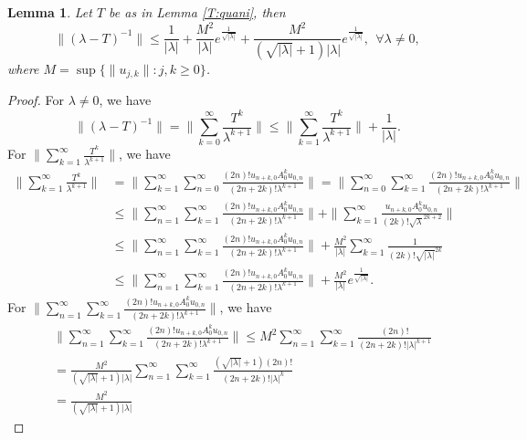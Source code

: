 \documentclass[12pt]{amsart}
\numberwithin{equation}{section}
\theoremstyle{plain}
\newtheorem{lem}[thm]{Lemma}
\theoremstyle{definition}
\begin{document}
\begin{lem}
Let $T$ be as in Lemma \ref{T:quani}, then
\begin{equation}\label{S4:lnorm}
\|(\lambda-T)^{-1}\|\leq \frac{1}{|\lambda|}+ \frac{M^2}{|\lambda|}e^{\frac{1}{\sqrt{|\lambda|}}}+
\frac{M^2}{(\sqrt{|\lambda|}+1)|\lambda|}e^{\frac{1}{\sqrt{|\lambda|}}}, \ \ \forall\lambda\neq 0,
\end{equation}
where $M=\sup\{\|u_{j,k}\|:j,k\geq 0\}$.
\end{lem}
\begin{proof}
For $\lambda \neq 0$, we have
$$\|(\lambda-T)^{-1}\|=
\| \sum\limits_{k=0}^{\infty}\frac{T^k}{\lambda^{k+1}}\|\leq\| \sum\limits_{k=1}^{\infty}\frac{T^k}{\lambda^{k+1}}\|+\frac{1}{|\lambda|}.$$
For $\|\sum\limits_{k=1}^{\infty}\frac{T^k}{\lambda^{k+1}}\|$, we have
\begin{align*}
\|\sum\limits_{k=1}^{\infty}\frac{T^k}{\lambda^{k+1}}\|
&=\|\sum\limits_{k=1}^{\infty}\sum\limits_{n=0}^{\infty}
\frac{(2n)!u_{n+k, 0}A_0^k u_{0,n}}{(2n+2k)!\lambda^{k+1}}\|
=\|\sum\limits_{n=0}^{\infty}\sum\limits_{k=1}^{\infty}
\frac{(2n)!u_{n+k, 0}A_0^k u_{0,n}}{(2n+2k)!\lambda^{k+1}}\|\\
&\leq\|\sum\limits_{n=1}^{\infty}\sum\limits_{k=1}^{\infty}
\frac{(2n)!u_{n+k, 0}A_0^k u_{0,n}}{(2n+2k)!\lambda^{k+1}}\|
+\|\sum\limits_{k=1}^{\infty}
\frac{u_{n+k, 0}A_0^k u_{0,n}}{(2k)!\sqrt \lambda^{2k+2}}\|\\
&\leq\|\sum\limits_{n=1}^{\infty}\sum\limits_{k=1}^{\infty}
\frac{(2n)!u_{n+k, 0}A_0^k u_{0,n}}{(2n+2k)!\lambda^{k+1}}\|+\frac{M^2}{|\lambda|} \sum\limits_{k=1}^{\infty}\frac{1}{(2k)!\sqrt{|\lambda|}^{2k}}\\
&\leq\|\sum\limits_{n=1}^{\infty}\sum\limits_{k=1}^{\infty}
\frac{(2n)!u_{n+k, 0}A_0^k u_{0,n}}{(2n+2k)!\lambda^{k+1}}\|
+\frac{M^2}{|\lambda|}e^{\frac{1}{\sqrt{|\lambda|}}}.
\end{align*}
For
$\|\sum\limits_{n=1}^{\infty}\sum\limits_{k=1}^{\infty}
\frac{(2n)!u_{n+k, 0}A_0^k u_{0,n}}{(2n+2k)!\lambda^{k+1}}\|$,
we have
\begin{align*}
&\|\sum\limits_{n=1}^{\infty}\sum\limits_{k=1}^{\infty}
\frac{(2n)!u_{n+k, 0}A_0^k u_{0,n}}{(2n+2k)!\lambda^{k+1}}\|
\leq M^2\sum\limits_{n=1}^{\infty}\sum\limits_{k=1}^{\infty}\frac{(2n)!}{(2n+2k)!|\lambda|^{k+1}}\\
&=
\frac {M^2}{(\sqrt{|\lambda|}+1)|\lambda|}
\sum\limits_{n=1}^{\infty}\sum\limits_{k=1}^{\infty}
\frac{(\sqrt{|\lambda|}+1)(2n)!}{(2n+2k)!|\lambda|^{k}}\\
&=
\frac{M^2}{(\sqrt{|\lambda|}+1)|\lambda|}

\end{align*}
\end{proof}
\end{document}
